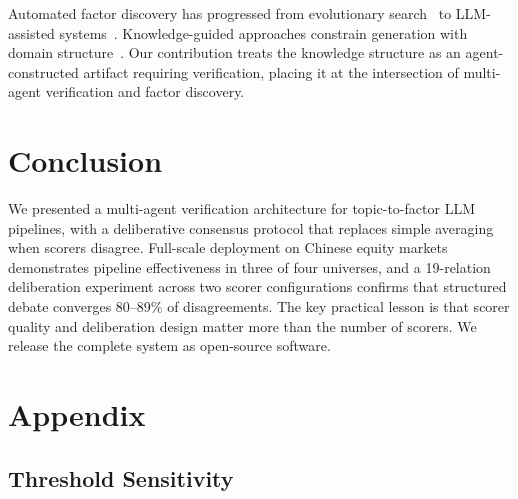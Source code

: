 \documentclass[sigconf]{acmart}
\begin{document}
Automated factor discovery has progressed from evolutionary search~\cite{kakushadze2016101} to LLM-assisted systems~\cite{wang2024alphagpt,tang2025alphaagent,shi2025alphaforge}. Knowledge-guided approaches constrain generation with domain structure~\cite{guo2022quant40,lin2026factorengine}. Our contribution treats the knowledge structure as an agent-constructed artifact requiring verification, placing it at the intersection of multi-agent verification and factor discovery.

\section{Conclusion}

We presented a multi-agent verification architecture for topic-to-factor LLM pipelines, with a deliberative consensus protocol that replaces simple averaging when scorers disagree. Full-scale deployment on Chinese equity markets demonstrates pipeline effectiveness in three of four universes, and a 19-relation deliberation experiment across two scorer configurations confirms that structured debate converges 80--89\% of disagreements. The key practical lesson is that scorer quality and deliberation design matter more than the number of scorers. We release the complete system as open-source software.





\clearpage
\appendix
\section{Appendix}

\subsection{Threshold Sensitivity}
\end{document}
